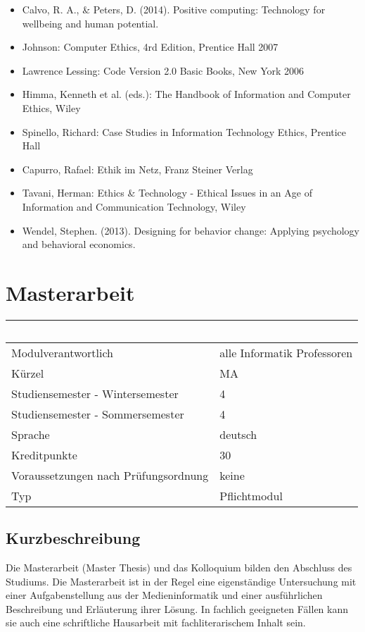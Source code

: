 \begin{itemize}
\item
  Calvo, R. A., \& Peters, D. (2014). Positive computing: Technology for
  wellbeing and human potential.
\item
  Johnson: Computer Ethics, 4rd Edition, Prentice Hall 2007
\item
  Lawrence Lessing: Code Version 2.0 Basic Books, New York 2006
\item
  Himma, Kenneth et al. (eds.): The Handbook of Information and Computer
  Ethics, Wiley
\item
  Spinello, Richard: Case Studies in Information Technology Ethics,
  Prentice Hall
\item
  Capurro, Rafael: Ethik im Netz, Franz Steiner Verlag
\item
  Tavani, Herman: Ethics \& Technology - Ethical Issues in an Age of
  Information and Communication Technology, Wiley
\item
  Wendel, Stephen. (2013). Designing for behavior change: Applying
  psychology and behavioral economics.
\end{itemize}

\chapter{Masterarbeit}\label{masterarbeit}

\begin{longtable}[]{@{}ll@{}}
\toprule
~ & ~\tabularnewline
\midrule
\endhead
Modulverantwortlich & alle Informatik Professoren\tabularnewline
Kürzel & MA\tabularnewline
Studiensemester - Wintersemester & 4\tabularnewline
Studiensemester - Sommersemester & 4\tabularnewline
Sprache & deutsch\tabularnewline
Kreditpunkte & 30\tabularnewline
Voraussetzungen nach Prüfungsordnung & keine\tabularnewline
Typ & Pflichtmodul\tabularnewline
\bottomrule
\end{longtable}

\section*{Kurzbeschreibung}\label{kurzbeschreibung}

Die Masterarbeit (Master Thesis) und das Kolloquium bilden den Abschluss
des Studiums. Die Masterarbeit ist in der Regel eine eigenständige
Untersuchung mit einer Aufgabenstellung aus der Medieninformatik und
einer ausführlichen Beschreibung und Erläuterung ihrer Lösung. In
fachlich geeigneten Fällen kann sie auch eine schriftliche Hausarbeit
mit fachliterarischem Inhalt sein.

